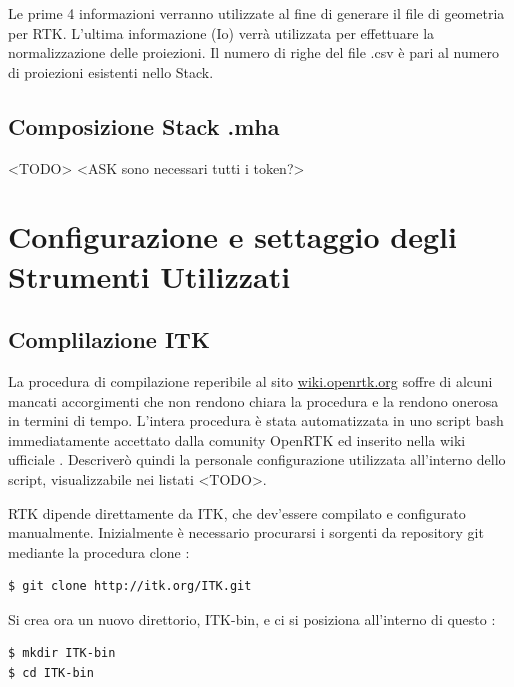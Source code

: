 \documentclass[a4paper,12pt, doubleside]{report}
\begin{document}
                    Le prime 4 informazioni verranno utilizzate al fine di generare il file di geometria per RTK. L'ultima informazione (Io) verrà utilizzata per effettuare la normalizzazione delle proiezioni. Il numero di righe del file .csv è pari al numero di proiezioni esistenti nello Stack.
                    
            \subsection{Composizione Stack .mha} 
                <TODO>
                <ASK sono necessari tutti i token?>
          
            
        \section{Configurazione e settaggio degli Strumenti Utilizzati}
            \subsection{Complilazione ITK}
                \par
                    La procedura di compilazione reperibile al sito \url{wiki.openrtk.org} soffre di alcuni mancati accorgimenti che non rendono chiara la procedura e la rendono onerosa in termini di tempo. L'intera procedura è stata automatizzata in uno script bash immediatamente accettato dalla comunity OpenRTK ed inserito nella wiki ufficiale
                    \cite{wiki-rtk}. Descriverò quindi la personale configurazione utilizzata all'interno dello script, visualizzabile nei listati <TODO>.
                \par    
                    RTK dipende direttamente da ITK, che dev'essere compilato e configurato manualmente. 
                    Inizialmente è necessario procurarsi i sorgenti da repository git mediante la procedura clone :
                    \begin{lstlisting}[language=bash, frame=bt]
$ git clone http://itk.org/ITK.git
                    \end{lstlisting}
                    
                    \bigskip
                    Si crea ora un nuovo direttorio, ITK-bin, e ci si posiziona all'interno di questo :
                    \begin{lstlisting}[language=bash, frame=bt]
$ mkdir ITK-bin
$ cd ITK-bin
                    \end{lstlisting}
                    
\end{document}
